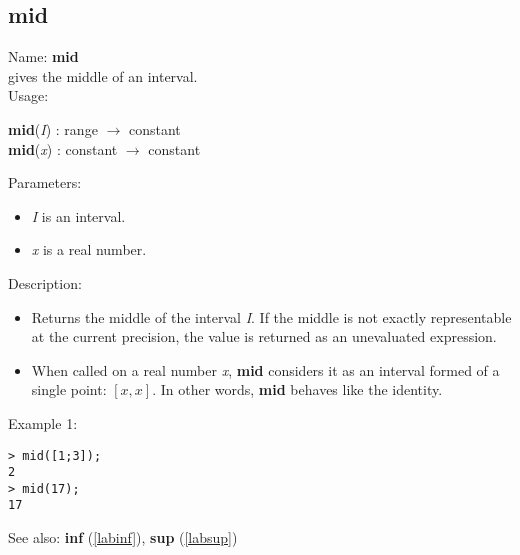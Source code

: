 \subsection{mid}
\label{labmid}
\noindent Name: \textbf{mid}\\
gives the middle of an interval.\\
\noindent Usage: 
\begin{center}
\textbf{mid}(\emph{I}) : \textsf{range} $\rightarrow$ \textsf{constant}\\
\textbf{mid}(\emph{x}) : \textsf{constant} $\rightarrow$ \textsf{constant}\\
\end{center}
Parameters: 
\begin{itemize}
\item \emph{I} is an interval.
\item \emph{x} is a real number.
\end{itemize}
\noindent Description: \begin{itemize}

\item Returns the middle of the interval \emph{I}. If the middle is not exactly
   representable at the current precision, the value is returned as an
   unevaluated expression.

\item When called on a real number \emph{x}, \textbf{mid} considers it as an interval formed
   of a single point: $\left[ x, x\right]$. In other words, \textbf{mid} behaves like the identity.
\end{itemize}
\noindent Example 1: 
\begin{center}\begin{minipage}{15cm}\begin{Verbatim}[frame=single]
> mid([1;3]);
2
> mid(17);
17
\end{Verbatim}
\end{minipage}\end{center}
See also: \textbf{inf} (\ref{labinf}), \textbf{sup} (\ref{labsup})
